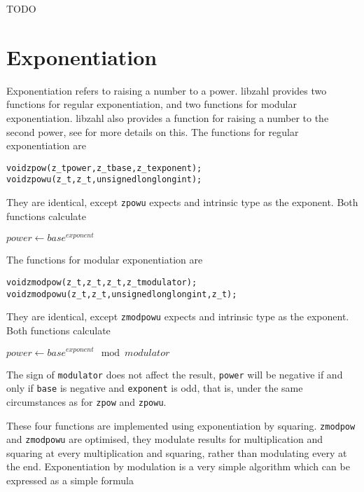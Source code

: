 TODO %


\newpage
\section{Exponentiation}
\label{sec:Exponentiation}

Exponentiation refers to raising a number to
a power. libzahl provides two functions for
regular exponentiation, and two functions for
modular exponentiation. libzahl also provides
a function for raising a number to the second
power, see  for
more details on this. The functions for regular
exponentiation are

\begin{alltt}
   void zpow(z_t power, z_t base, z_t exponent);
   void zpowu(z_t, z_t, unsigned long long int);
\end{alltt}

\noindent
They are identical, except {\tt zpowu} expects
and intrinsic type as the exponent. Both functions
calculate

\vspace{1em}
$power \gets base^{exponent}$
\vspace{1em}

\noindent
The functions for modular exponentiation are
\begin{alltt}
   void zmodpow(z_t, z_t, z_t, z_t modulator);
   void zmodpowu(z_t, z_t, unsigned long long int, z_t);
\end{alltt}

\noindent
They are identical, except {\tt zmodpowu} expects
and intrinsic type as the exponent. Both functions
calculate

\vspace{1em}
$power \gets base^{exponent} \mod modulator$
\vspace{1em}

The sign of {\tt modulator} does not affect the
result, {\tt power} will be negative if and only
if {\tt base} is negative and {\tt exponent} is
odd, that is, under the same circumstances as for
{\tt zpow} and {\tt zpowu}.

These four functions are implemented using
exponentiation by squaring. {\tt zmodpow} and
{\tt zmodpowu} are optimised, they modulate
results for multiplication and squaring at
every multiplication and squaring, rather than
modulating every at the end. Exponentiation
by modulation is a very simple algorithm which
can be expressed as a simple formula

